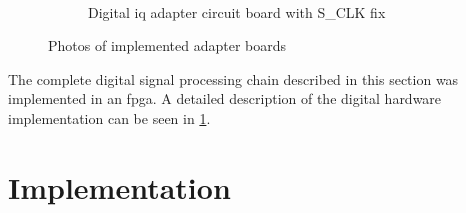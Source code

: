 \documentclass[12pt,a4paper,parskip=full,abstract=true,BCOR=12mm,twoside,open=right]{scrreprt}
\begin{document}
\begin{figure}[htb]
\begin{subfigure}[c]{.45\linewidth}
        \label{fig:adc_adapter_circ}
    \end{subfigure}%
    ~
    \begin{subfigure}[c]{.45\linewidth}
        \centering
        \caption{Digital \gls{iq} adapter circuit board with S\_CLK fix}
        \label{fig:iq_adapter_circ}
    \end{subfigure}
    \caption{Photos of implemented adapter boards}
    \label{fig:adapters}
\end{figure}

The complete digital signal processing chain described in this section was implemented
in an \gls{fpga}. A detailed description of the digital hardware implementation can
be seen in \cref{chap:fpga}.


\chapter{ Implementation}
\label{chap:fpga}
\end{document}
